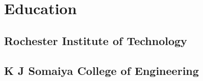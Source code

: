 \documentclass[]{main}
\begin{document}
\begin{minipage}[t]{0.25\textwidth}
\section{Education} 
\subsection{Rochester Institute of Technology}
\sectionsep
{}
\sectionsep\sectionsep

\subsection{K J Somaiya College of Engineering}
\sectionsep
{}
\sectionsep\sectionsep

%
%

\end{minipage} 
\hfill
\end{document}
